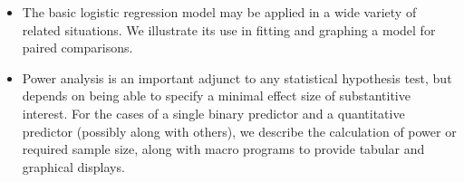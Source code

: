 \begin{itemize}
\item The basic logistic regression model may be applied in a wide
variety of related situations.  We illustrate its use in fitting
and graphing a model for paired comparisons.

\item Power analysis is an important adjunct to any statistical hypothesis
test, but depends on being able to specify a minimal effect size of
substantitive interest.
For the cases of a single binary predictor and a quantitative predictor
(possibly along with others), we describe the calculation of power or
required sample size, along with macro programs to provide tabular and
graphical displays.
\end{itemize}
